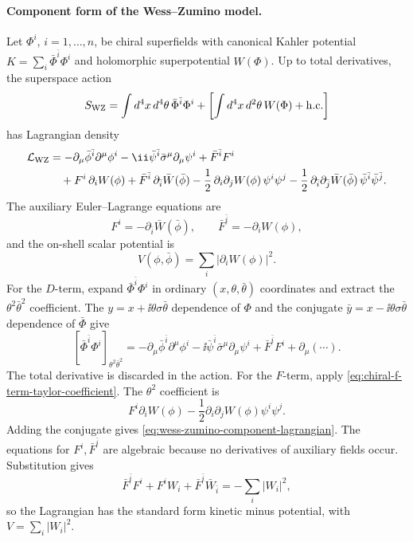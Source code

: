 \paragraph{Component form of the Wess--Zumino model.}
Let \(\Phi^i\), \(i=1,\ldots,n\), be chiral superfields with canonical
Kahler potential \(K=\sum_i\bar\Phi^{\bar i}\Phi^i\) and holomorphic
superpotential \(W(\Phi)\).  Up to total derivatives, the superspace action
\[
  S_{\rm WZ}
  =
  \int d^4x\,d^4\theta\,\bar\Phi^{\bar i}\Phi^i
  +
  \left[
    \int d^4x\,d^2\theta\,W(\Phi)+{\rm h.c.}
  \right]
\]
has Lagrangian density
\begin{align}
  \mathcal L_{\rm WZ}
  &=
  -\partial_\mu\bar\phi^{\bar i}\partial^\mu\phi^i
  -\ii\bar\psi^{\bar i}\bar\sigma^\mu\partial_\mu\psi^i
  +\bar F^{\bar i}F^i                                      \notag\\
  &\quad
  +F^i\,\partial_i W(\phi)
  +\bar F^{\bar i}\,\partial_{\bar i}\bar W(\bar\phi)
  -\frac12\,\partial_i\partial_jW(\phi)\,\psi^i\psi^j
  -\frac12\,\partial_{\bar i}\partial_{\bar j}\bar W(\bar\phi)\,
  \bar\psi^{\bar i}\bar\psi^{\bar j}.
  \label{eq:wess-zumino-component-lagrangian}
\end{align}
The auxiliary Euler--Lagrange equations are
\[
  F^i=-\partial_{\bar i}\bar W(\bar\phi),
  \qquad
  \bar F^{\bar i}=-\partial_i W(\phi),
\]
and the on-shell scalar potential is
\[
  V(\phi,\bar\phi)
  =
  \sum_i|\partial_iW(\phi)|^2 .
\]
For the \(D\)-term, expand \(\bar\Phi^{\bar i}\Phi^i\) in ordinary
\((x,\theta,\bar\theta)\) coordinates and extract the
\(\theta^2\bar\theta^2\) coefficient.  The \(y=x+\ii\theta\sigma\bar\theta\)
dependence of \(\Phi\) and the conjugate
\(\bar y=x-\ii\theta\sigma\bar\theta\) dependence of \(\bar\Phi\) give
\[
  [\bar\Phi^{\bar i}\Phi^i]_{\theta^2\bar\theta^2}
  =
  -\partial_\mu\bar\phi^{\bar i}\partial^\mu\phi^i
  -\ii\bar\psi^{\bar i}\bar\sigma^\mu\partial_\mu\psi^i
  +\bar F^{\bar i}F^i
  +\partial_\mu(\cdots).
\]
The total derivative is discarded in the action.  For the \(F\)-term, apply
\eqref{eq:chiral-f-term-taylor-coefficient}.  The \(\theta^2\) coefficient is
\[
  F^i\partial_iW(\phi)
  -\frac12\partial_i\partial_jW(\phi)\psi^i\psi^j .
\]
Adding the conjugate gives \eqref{eq:wess-zumino-component-lagrangian}.
The equations for \(F^i,\bar F^{\bar i}\) are algebraic because no
derivatives of auxiliary fields occur.  Substitution gives
\[
  \bar F^{\bar i}F^i
  +F^i W_i+\bar F^{\bar i}\bar W_{\bar i}
  =
  -\sum_i|W_i|^2,
\]
so the Lagrangian has the standard form kinetic minus potential, with
\(V=\sum_i|W_i|^2\).

